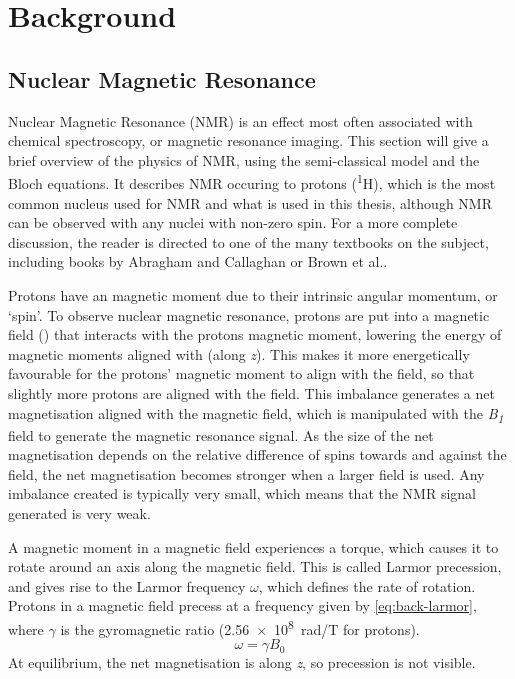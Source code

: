 \chapter{Background}\label{ch:background}

\section{Nuclear Magnetic Resonance}

Nuclear Magnetic Resonance (NMR) is an effect most often associated with chemical spectroscopy, or magnetic resonance imaging.
This section will give a brief overview of the physics of NMR, using the semi-classical model and the Bloch equations.
It describes NMR occuring to protons (\textsuperscript{1}H), which is the most common nucleus used for NMR and what is used in this thesis, although NMR can be observed with any nuclei with non-zero spin.
For a more complete discussion, the reader is directed to one of the many textbooks on the subject, including books by Abragham\cite{AbragamPrinciplesNuclearMagnetism1961} and Callaghan\cite{CallaghanPrinciplesNuclearMagnetic1994} or Brown et al.\cite{BrownMagneticResonanceImaging2014a}.

Protons have an magnetic moment due to their intrinsic angular momentum, or `spin'.
To observe nuclear magnetic resonance, protons are put into a magnetic field (\Bzero) that interacts with the protons magnetic moment, lowering the energy of magnetic moments aligned with \Bzero (along \textit{z}).
This makes it more energetically favourable for the protons' magnetic moment to align with the field, so that slightly more protons are aligned with the field.
This imbalance generates a net magnetisation aligned with the magnetic field, which is manipulated with the \textit{B\textsubscript{1}} field to generate the magnetic resonance signal.
As the size of the net magnetisation depends on the relative difference of spins towards and against the field, the net magnetisation becomes stronger when a larger \Bzero field is used.
Any imbalance created is typically very small, which means that the NMR signal generated is very weak.


A magnetic moment in a magnetic field experiences a torque, which causes it to rotate around an axis along the magnetic field.
This is called Larmor precession, and gives rise to the Larmor frequency $\omega$, which defines the rate of rotation.
Protons in a magnetic field precess at a frequency given by \autoref{eq:back-larmor}, where $\gamma$ is the gyromagnetic ratio (\SI{2.56e8}{rad/T} for protons).
\begin{equation}
\omega = \gamma B_0
\label{eq:back-larmor}
\end{equation}
At equilibrium, the net magnetisation is along \textit{z}, so precession is not visible.

